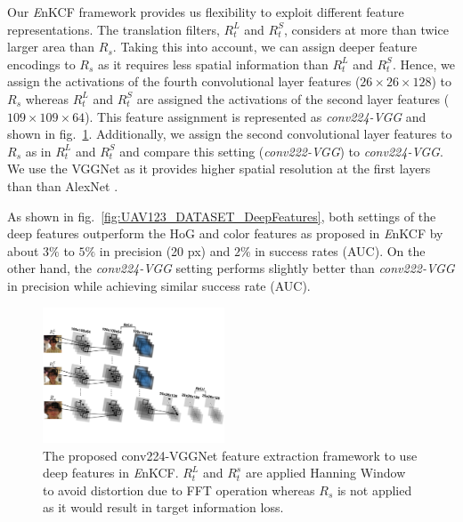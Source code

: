\documentclass[10pt,twocolumn,letterpaper]{article}
\begin{document}
Our {\it E}nKCF framework provides us flexibility to exploit different feature representations. The translation filters, $R_{t}^{L}$ and $R_{t}^{S}$, 
considers at more than twice larger area than $R_{s}$. Taking this into account, we can assign deeper feature encodings to $R_{s}$ as it requires less
spatial information than  $R_{t}^{L}$ and $R_{t}^{S}$. Hence, we assign the activations of the fourth convolutional layer features ($26\times26\times128$) to $R_{s}$  whereas $R_{t}^{L}$ and $R_{t}^{S}$ are assigned the activations of the second layer features ($109\times109\times64$). This feature assignment is represented as  \textit{conv224-VGG} and shown in fig.~\ref{fig:Filters_CNN}. Additionally, we assign the second convolutional layer features to $R_{s}$ as in $R_{t}^{L}$ and $R_{t}^{S}$ and compare this setting  (\textit{conv222-VGG}) to  \textit{conv224-VGG}. We use the VGGNet as it provides higher spatial resolution at the first layers than than AlexNet \cite{krizhevsky2012imagenet}.

As shown in fig.~\ref{fig:UAV123_DATASET_DeepFeatures}, both settings of the deep features outperform the HoG and color features as proposed in {\it E}nKCF by about $3\%$ to $5\%$ in precision (20 px) and $2\%$ in success rates (AUC). On the other hand, the \textit{conv224-VGG} setting performs slightly better than  \textit{conv222-VGG} in precision while achieving similar success rate (AUC).

\begin{figure}[!h]
\centering
\includegraphics[width=0.48\textwidth]{./figures/Filters_Details_CNN.pdf}
\caption{The proposed conv224-VGGNet feature extraction framework to use deep features in {\it E}nKCF. $R_{t}^{L}$ and $R_{t}^{s}$ are applied Hanning Window
to avoid distortion due to FFT operation whereas $R_{s}$ is not applied as it would result in target information loss.}
\label{fig:Filters_CNN}
\end{figure}
\end{document}
